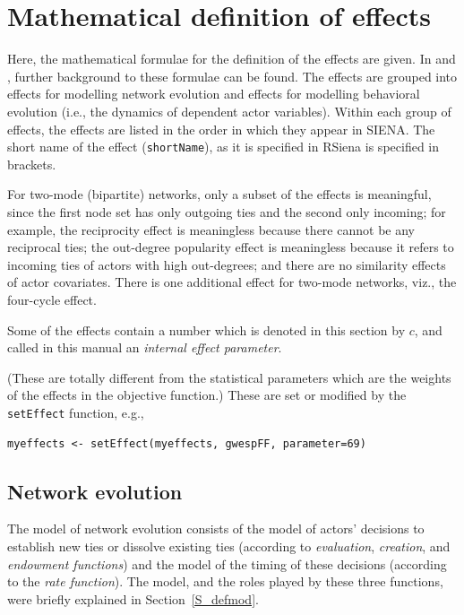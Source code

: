 \documentclass[a4paper,fleqn,11pt]{article}
\newcommand{\+}{\, + \,}
\newcommand{\RS}{{\sf RSiena }}
\newcommand{\si}{{\sf SIENA}}
\begin{document}
\newpage
\section[Formulas for effects]{Mathematical definition of effects}
\label{S_math}


Here, the mathematical formulae for the definition of the effects
are given. In \citet{Snijders01,Snijders05} and \citet*{SteglichEA10},
further background to these formulae can be found.
The effects are grouped into effects for modelling network
evolution and effects for modelling behavioral evolution (i.e.,
the dynamics of dependent actor variables). Within each group of
effects, the effects are listed in the order in which they appear
in \si. The short name of the effect (\texttt{shortName}),
as it is specified in \RS is specified in brackets.


For two-mode (bipartite) networks, only a subset of the effects is
meaningful, since the first node set has only outgoing ties
and the second only incoming; for example, the reciprocity effect
is meaningless because there cannot be any reciprocal ties;
the out-degree popularity effect is meaningless because it refers to
incoming ties of actors with high out-degrees; and there are no similarity
effects of actor covariates.
There is one additional effect for two-mode networks, viz.,
the four-cycle effect.

\hypertarget{T_effpar}{
Some of the effects contain a number which is denoted in this section
by $c$, and called in this manual an \emph{internal effect parameter}.
}
(These are totally different from the statistical parameters which are
the weights of the effects in the objective function.)
These are set or modified by the \texttt{setEffect} function, e.g.,
\begin{verbatim}
myeffects <- setEffect(myeffects, gwespFF, parameter=69)
\end{verbatim}

\subsection{Network evolution}
The model of network evolution consists of the model of actors'
decisions to establish new ties or dissolve existing ties
(according to {\it evaluation}, {\it creation},
and {\it endowment functions}) and the
model of the timing of these decisions (according to the {\it rate
function}).
The model, and the roles played by these three functions,
were briefly explained in Section~\ref{S_defmod}.
\end{document}
